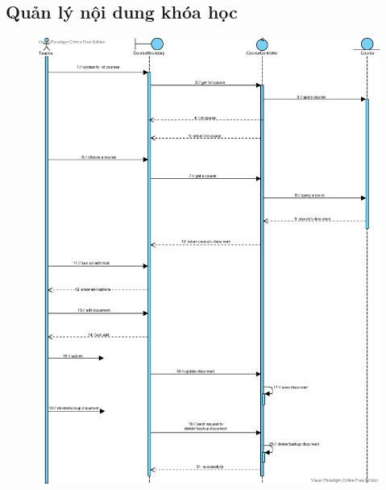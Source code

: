 \documentclass[./../main_file.tex]{subfiles}
\begin{document}
	\subsection{Quản lý nội dung khóa học }
	\begin{figure}[H]
		\centering
		\includegraphics[width=\linewidth]{./images/sequence_diagram/3_13_manage_contentcourse.eps}
	\end{figure}	
	
\end{document}

